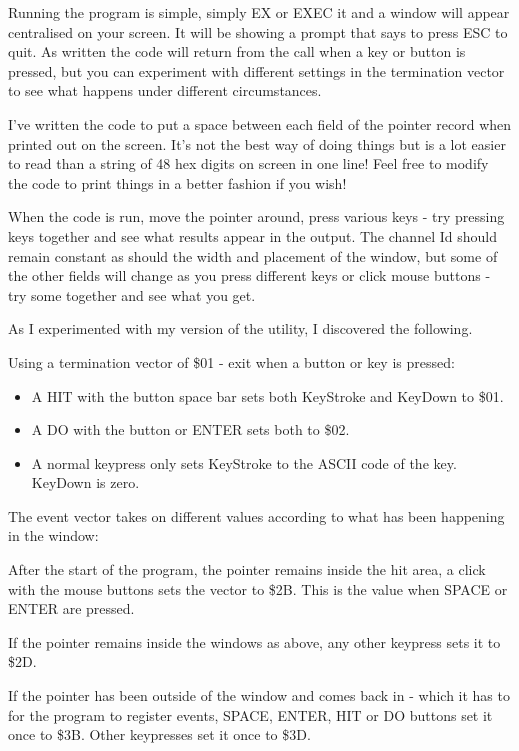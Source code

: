 Running the program is simple, simply EX or EXEC it and a window will appear centralised
on your screen. It will be showing a prompt that says to press ESC to quit. As written the
code will return from the  call when a key or button is pressed, but you can
experiment with different settings in the termination vector to see what happens under
different circumstances.

I've written the code to put a space between each field of the pointer record when printed
out on the screen. It's not the best way of doing things but is a lot easier to read than
a string of 48 hex digits on screen in one line! Feel free to modify the code to print
things in a better fashion if you wish!

When the code is run, move the pointer around, press various keys -{} try pressing keys
together and see what results appear in the output. The channel Id should remain constant
as should the width and placement of the window, but some of the other fields will change
as you press different keys or click mouse buttons -{} try some together and see what you
get.

As I experimented with my version of the utility, I discovered the following.

Using a termination vector of \$01 -{} exit when a button or key is pressed:
\begin{itemize}[itemsep=0pt]

\item{}A HIT with the button space bar sets both KeyStroke and KeyDown to
\$01.

\item{}A DO with the button or ENTER sets both to \$02. 

\item{}A normal keypress only sets KeyStroke to the ASCII code of the key.
KeyDown is zero.

\end{itemize}

The event vector takes on different values according to what has been happening in the
window:

After the start of the program, the pointer remains inside the hit area, a click with the
mouse buttons sets the vector to \$2B. This is the value when SPACE or ENTER are
pressed.

If the pointer remains inside the windows as above, any other keypress sets it to
\$2D.

If the pointer has been outside of the window and comes back in -{} which it has to for the
program to register events, SPACE, ENTER, HIT or DO buttons set it once to \$3B. Other
keypresses set it once to \$3D.

